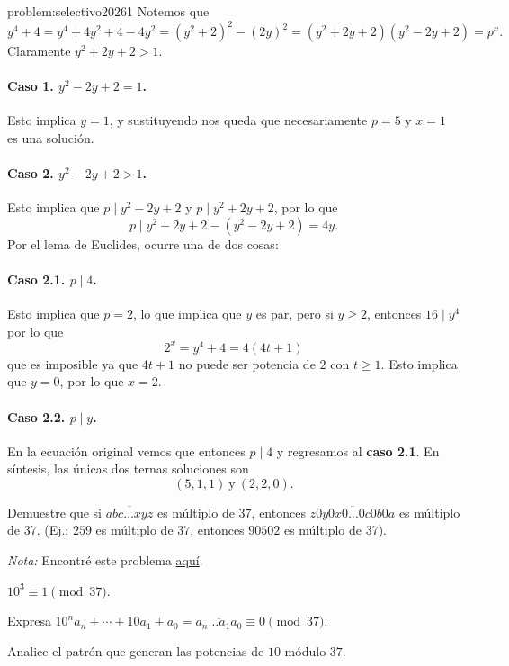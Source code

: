 \begin{solutiontoproblem}{problem:selectivo20261}
	Notemos que
	\[y^4 + 4 = y^4 + 4y^2 + 4 - 4y^2 = (y^2 + 2)^2 - (2y)^2 = (y^2 + 2y + 2)(y^2 - 2y + 2) = p^x.\]
	Claramente $y^2 + 2y + 2 > 1$.
	\paragraph{Caso 1. $y^2 - 2y + 2 = 1$.}
	Esto implica $y = 1$, y sustituyendo nos queda que necesariamente $p = 5$ y $x = 1$
	es una solución.
	\paragraph{Caso 2. $y^2 - 2y + 2 > 1$. }
	Esto implica que $p \mid y^2 - 2y + 2$ y $p \mid y^2 + 2y + 2$,
	por lo que
	\[p \mid y^2 + 2y + 2 - (y^2 - 2y + 2) = 4y.\]
	Por el lema de Euclides, ocurre una de dos cosas:
	\paragraph{Caso 2.1. $p \mid 4$. } Esto implica
	que $p = 2$, lo que implica que $y$ es par,
	pero si $y \geq 2$, entonces $16 \mid y^4$
	por lo que
	\[2^x = y^4 + 4 = 4(4t + 1)\]
	que es imposible ya que $4t + 1$ no puede
	ser potencia de $2$ con $t \geq 1$.
	Esto implica que $y = 0$, por lo que $x = 2$.

	\paragraph{Caso 2.2. $p \mid y$. } En la ecuación original
	vemos que entonces $p \mid 4$ y regresamos al \textbf{caso 2.1}.
	En síntesis, las únicas dos ternas soluciones son
	\[(5, 1, 1) \  \text{y} \  (2, 2, 0).\]
\end{solutiontoproblem}

\begin{problem}[CAM JT 2025]
Demuestre que si $\overline{abc\dots{x}yz}$ es múltiplo de $37$,
entonces $\overline{z0y0x0\dots0c0b0a}$ es múltiplo de 37.
(Ej.: $259$ es múltiplo de $37$, entonces $90502$ es múltiplo de 37).

\textit{Nota: } Encontré este problema \href{https://www.youtube.com/watch?v=d6iQrh2TK98&t=178s}{aquí}.
\begin{hints}
	\begin{hint}
		$10^3 \equiv 1 \pmod {37}$.
	\end{hint}
	\begin{hint}
		Expresa $10^na_n + \cdots + 10a_1 + a_0 = \overline{a_n\dots a_1a_0} \equiv 0 \pmod{37}$.
	\end{hint}
	\begin{hint}
		Analice el patrón que generan las potencias
		de $10$ módulo $37$.
	\end{hint}
\end{hints}
\end{problem}

